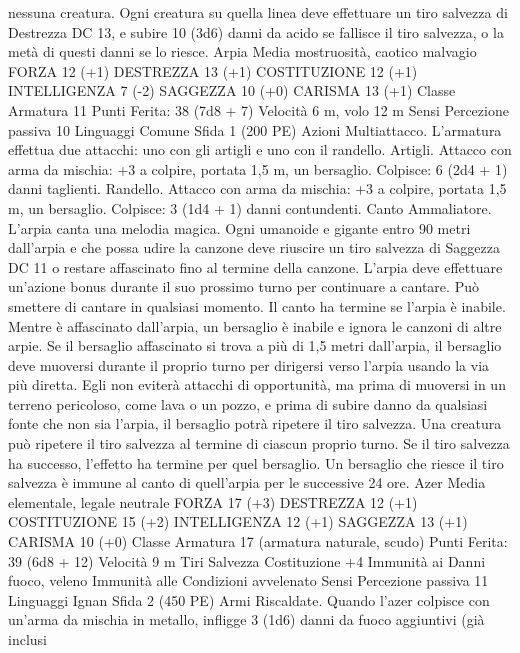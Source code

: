 \begin{multicols}{2}
nessuna creatura. Ogni creatura su quella linea deve effettuare un
tiro salvezza di Destrezza DC 13, e subire 10 (3d6) danni da
acido se fallisce il tiro salvezza, o la metà di questi danni se lo
riesce.
Arpia
Media mostruosità, caotico malvagio
FORZA 12 (+1)
DESTREZZA 13 (+1)
COSTITUZIONE 12 (+1)
INTELLIGENZA 7 (-2)
SAGGEZZA 10 (+0)
CARISMA 13 (+1)
Classe Armatura 11
\hspace*{0pt}\hfill{Punti Ferita}: 38 (7d8 + 7)
Velocità 6 m, volo 12 m
Sensi Percezione passiva 10
Linguaggi Comune
Sfida 1 (200 PE)
Azioni
Multiattacco. L’armatura effettua due attacchi: uno con gli
artigli e uno con il randello.
Artigli. Attacco con arma da mischia: +3 a colpire, portata 1,5
m, un bersaglio.
Colpisce: 6 (2d4 + 1) danni taglienti.
Randello. Attacco con arma da mischia: +3 a colpire, portata 1,5
m, un bersaglio.
Colpisce: 3 (1d4 + 1) danni contundenti.
Canto Ammaliatore. L’arpia canta una melodia magica. Ogni
umanoide e gigante entro 90 metri dall’arpia e che possa udire la
canzone deve riuscire un tiro salvezza di Saggezza DC 11 o
restare affascinato fino al termine della canzone. L’arpia deve
effettuare un’azione bonus durante il suo prossimo turno per
continuare a cantare. Può smettere di cantare in qualsiasi
momento. Il canto ha termine se l’arpia è inabile.
Mentre è affascinato dall’arpia, un bersaglio è inabile e ignora le
canzoni di altre arpie. Se il bersaglio affascinato si trova a più di
1,5 metri dall’arpia, il bersaglio deve muoversi durante il proprio
turno per dirigersi verso l’arpia usando la via più diretta. Egli
non eviterà attacchi di opportunità, ma prima di muoversi in un
terreno pericoloso, come lava o un pozzo, e prima di subire
danno da qualsiasi fonte che non sia l’arpia, il bersaglio potrà
ripetere il tiro salvezza. Una creatura può ripetere il tiro salvezza
al termine di ciascun proprio turno. Se il tiro salvezza ha
successo, l’effetto ha termine per quel bersaglio.
Un bersaglio che riesce il tiro salvezza è immune al canto di
quell’arpia per le successive 24 ore.
Azer
Media elementale, legale neutrale
FORZA 17 (+3)
DESTREZZA 12 (+1)
COSTITUZIONE 15 (+2)
INTELLIGENZA 12 (+1)
SAGGEZZA 13 (+1)
CARISMA 10 (+0)
Classe Armatura 17 (armatura naturale, scudo)
\hspace*{0pt}\hfill{Punti Ferita}: 39 (6d8 + 12)
Velocità 9 m
Tiri Salvezza Costituzione +4
Immunità ai Danni fuoco, veleno
Immunità alle Condizioni avvelenato
Sensi Percezione passiva 11
Linguaggi Ignan
Sfida 2 (450 PE)
Armi Riscaldate. Quando l’azer colpisce con un’arma da mischia
in metallo, infligge 3 (1d6) danni da fuoco aggiuntivi (già inclusi

\end{multicols}
